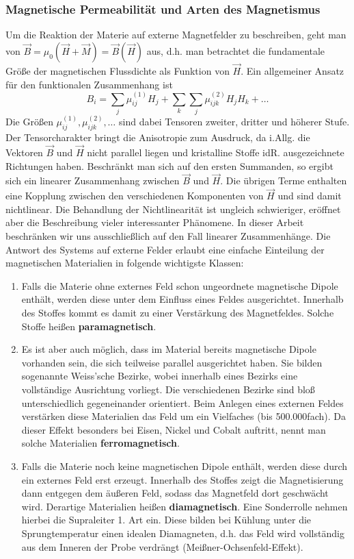 \documentclass[german,  %
parskip=full,  %
]{scrartcl}
\begin{document}
\subsubsection{Magnetische Permeabilität und Arten des Magnetismus}
Um die Reaktion der Materie auf externe Magnetfelder zu beschreiben, geht man von \(\vec{B} = \mu_0(\vec{H} + \vec{M}) = \vec{B}(\vec{H})\) aus, d.h. man betrachtet die fundamentale Größe der magnetischen Flussdichte als Funktion von \(\vec{H}\). Ein allgemeiner Ansatz für den funktionalen Zusammenhang ist
\[B_i = \sum_{j}\mu_{ij}^{(1)} H_{j} + \sum_{k}\sum_{j}\mu_{ijk}^{(2)} H_{j}H_k  + \hdots\]
Die Größen \(\mu_{ij}^{(1)},\mu_{ijk}^{(2)},\hdots\) sind dabei Tensoren zweiter, dritter und höherer Stufe. Der Tensorcharakter bringt die Anisotropie zum Ausdruck, da i.Allg. die Vektoren \(\vec{B}\) und \(\vec{H}\) nicht parallel liegen und kristalline Stoffe idR. ausgezeichnete Richtungen haben. Beschränkt man sich auf den ersten Summanden, so ergibt sich ein linearer Zusammenhang zwischen \(\vec{B}\) und \(\vec{H}\). Die übrigen Terme enthalten eine Kopplung zwischen den verschiedenen Komponenten von \(\vec{H}\) und sind damit nichtlinear. Die Behandlung der Nichtlinearität ist ungleich schwieriger, eröffnet aber die Beschreibung vieler interessanter Phänomene. In dieser Arbeit beschränken wir uns ausschließlich auf den Fall linearer Zusammenhänge. Die Antwort des Systems auf externe Felder erlaubt eine einfache Einteilung der magnetischen Materialien in folgende wichtigste Klassen:
\begin{enumerate}
\item Falls die Materie ohne externes Feld schon ungeordnete magnetische Dipole enthält, werden diese unter dem Einfluss eines Feldes ausgerichtet. Innerhalb des Stoffes kommt es damit zu einer Verstärkung des Magnetfeldes. Solche Stoffe heißen \textbf{paramagnetisch}.
\item Es ist aber auch möglich, dass im Material bereits magnetische Dipole vorhanden sein, die sich teilweise parallel ausgerichtet haben. Sie bilden sogenannte Weiss'sche Bezirke, wobei innerhalb eines Bezirks eine vollständige Ausrichtung vorliegt. Die verschiedenen Bezirke sind bloß unterschiedlich gegeneinander orientiert. Beim Anlegen eines externen Feldes verstärken diese Materialien das Feld um ein Vielfaches (bis 500.000fach). Da dieser Effekt besonders bei Eisen, Nickel und Cobalt auftritt, nennt man solche Materialien \textbf{ferromagnetisch}. 
\item Falls die Materie noch keine magnetischen Dipole enthält, werden diese durch ein externes Feld erst erzeugt. Innerhalb des Stoffes zeigt die Magnetisierung dann entgegen dem äußeren Feld, sodass das Magnetfeld dort geschwächt wird. Derartige Materialien heißen \textbf{diamagnetisch}. Eine Sonderrolle nehmen hierbei die Supraleiter 1. Art ein. Diese bilden bei Kühlung unter die Sprungtemperatur einen idealen Diamagneten, d.h. das Feld wird vollständig aus dem Inneren der Probe verdrängt (Meißner-Ochsenfeld-Effekt).
\end{enumerate}
\end{document}
